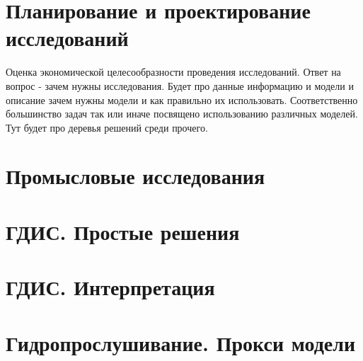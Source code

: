 \documentclass{memoir}
\begin{document}
\chapter{Планирование и проектирование исследований}

Оценка экономической целесообразности проведения исследований. Ответ на вопрос - зачем нужны исследования. 
Будет про данные информацию и модели и описание зачем нужны модели и как правильно их использовать.
Соответственно большинство задач так или иначе посвящено использованию различных моделей. 
Тут будет про деревья решений среди прочего.





\chapter{Промысловые исследования}









\chapter{ГДИС. Простые решения}




\chapter{ГДИС. Интерпретация}





\chapter{Гидропрослушивание. Прокси модели}









\printbibliography
\end{document}
